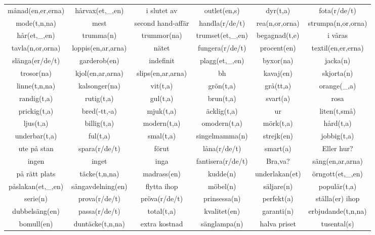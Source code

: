 \begin{center}
    \begin{adjustwidth}{-2cm}{}
        \begin{tabular}{|c c c c c c|}
            \hline
            månad(en,er,erna) & hårvax(et,\_,en) & i slutet av & outlet(en,s) & dyr(t,a) & fota(r/de/t) \\
            mode(t,n,na) & mest & second hand-affär & handla(r/de/t) & rea(n,or,orna) & strumpa(n,or,orna) \\
            hår(et,\_,en) & trumma(n) & trummor(na) & trumset(et,\_,en) & begagnad(t,e) & i våras \\
            tavla(n,or,orna) & loppis(en,ar,arna) & nätet & fungera(r/de/t) & procent(en) & textil(en,er,erna) \\
            slänga(er/de/t) & garderob(en) & indefinit & plagg(et,\_,en) & byxor(na) & jacka(n) \\
            trosor(na) & kjol(en,ar,arna) & slips(en,ar,arna) & bh & kavaj(en) & skjorta(n) \\
            linne(t,n,na) & kalsonger(na) & vit(t,a) & grön(t,a) & grå(tt,a) & orange(\_,a) \\
            randig(t,a) & rutig(t,a) & gul(t,a) & brun(t,a) & svart(a) & rosa \\
            prickig(t,a) & bred(-tt,-a) & mjuk(t,a) & äcklig(t,a) & ur & liten(t,små) \\
            ljus(t,a) & billig(t,a) & modern(t,a) & omodern(t,a) & mörk(t,a) & hård(t,a) \\
            underbar(t,a) & ful(t,a) & smal(t,a) & singelmamma(n) & strejk(en) & jobbig(t,a) \\
            ute på stan & spara(r/de/t) & förut & låna(r/de/t) & smart(a) & Eller hur? \\
            ingen & inget & inga & fantisera(r/de/t) & Bra,va? & säng(en,ar,arna) \\
            på rätt plats & täcke(t,n,na) & madrass(en) & kudde(n) & underlakan(et) & örngott(et,\_,en) \\
            påslakan(et,\_,en) & sängavdelning(en) & flytta ihop & möbel(n) & säljare(n) & populär(t,a) \\
            serie(n) & prova(r/de/t) & pröva(r/de/t) & prinsessa(n) & perfekt(a) & ställa(er) ihop \\
            dubbelsäng(en) & passa(r/de/t) & total(t,a) & kvalitet(en) & garanti(n) & erbjudande(t,n,na) \\
            bomull(en) & duntäcke(t,n,na) & extra kostnad & sänglampa(n) & halva priset & tusental(s) \\

\end{tabular}
\end{adjustwidth}
\end{center}
